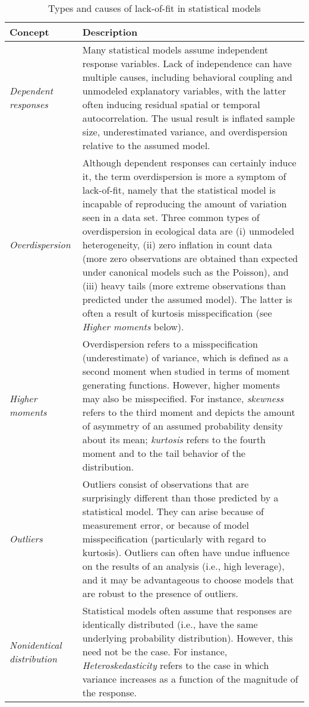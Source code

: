 \documentclass[12pt,english]{article}
\begin{document}
\begin{spacing}{1.9}
    \begin{table}[htp]
      \caption{Types and causes of lack-of-fit in statistical models}
      \label{tab:lof}
      \centering
      \begin{tabular}{p{3cm}p{13cm}}
        \hline
        Concept & Description \\
        \hline
        \textit{Dependent responses} & Many statistical models assume independent response variables.  Lack of independence can have multiple causes, including behavioral coupling and unmodeled explanatory variables, with the latter often inducing residual spatial or temporal autocorrelation.  The usual result is inflated sample size, underestimated variance, and overdispersion relative to the assumed model. \\
        \textit{Overdispersion} & Although dependent responses can certainly induce it, the term overdispersion is more a symptom of lack-of-fit, namely that the statistical model is incapable of reproducing the amount of variation seen in a data set.  Three common types of overdispersion in ecological data are (i) unmodeled heterogeneity, (ii) zero inflation in count data (more zero observations are obtained than expected under canonical models such as the Poisson), and (iii) heavy tails (more extreme observations than predicted under the assumed model). The latter is often a result of kurtosis misspecification (see \textit{Higher moments} below).\\
        \textit{Higher moments} & Overdispersion refers to a misspecification (underestimate) of variance, which is defined as a second moment when studied in terms of moment generating functions.  However, higher moments may also be misspecified. For instance, \textit{skewness} refers to the third moment and depicts the amount of asymmetry of an assumed probability density about its mean; \textit{kurtosis} refers to the fourth moment and to the tail behavior of the distribution.  \\
        \textit{Outliers} & Outliers consist of observations that are surprisingly different than those predicted by a statistical model.  They can arise because of measurement error, or because of model misspecification (particularly with regard to kurtosis).  Outliers can often have undue influence on the results of an analysis (i.e., high leverage), and it may be advantageous to choose models that are robust to the presence of outliers. \\
        \textit{Nonidentical distribution} & Statistical models often assume that responses are identically distributed (i.e., have the same underlying probability distribution). However, this need not be the case.  For instance, \textit{Heteroskedasticity} refers to the case in which variance increases as a function of the magnitude of the response.\\

\end{tabular}
\end{table}
\end{spacing}
\end{document}
